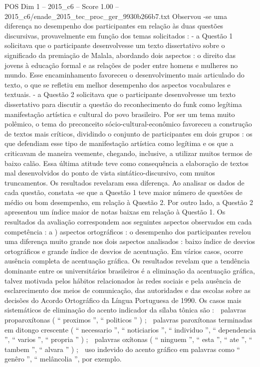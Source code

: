 \begin{textsample}{POS Dim 1 – 2015\_c6 – Score 1.00 – 2015\_c6/enade\_2015\_tec\_proc\_ger\_9930b266b7.txt}
Observou -se uma diferença no desempenho dos participantes em relação às duas questões discursivas, provavelmente em função dos temas solicitados : - a Questão 1 solicitava que o participante desenvolvesse um texto dissertativo sobre o significado da premiação de Malala, abordando dois aspectos : o direito das jovens à educação formal e as relações de poder entre homens e mulheres no mundo.
Esse encaminhamento favoreceu o desenvolvimento mais articulado do texto, o que se refletiu em melhor desempenho dos aspectos vocabulares e textuais. - a Questão 2 solicitava que o participante desenvolvesse um texto dissertativo para discutir a questão do reconhecimento do funk como legítima manifestação artística e cultural do povo brasileiro.
Por ser um tema muito polêmico, o tema do preconceito sócio-cultural-econômico favoreceu a construção de textos mais críticos, dividindo o conjunto de participantes em dois grupos : os que defendiam esse tipo de manifestação artística como legítima e os que a criticavam de maneira veemente, chegando, inclusive, a utilizar muitos termos de baixo calão.
Essa última atitude teve como consequência a elaboração de textos mal desenvolvidos do ponto de vista sintático-discursivo, com muitos truncamentos.
Os resultados revelaram essa diferença.
Ao analisar os dados de cada questão, constata -se que a Questão 1 teve maior número de questões de médio ou bom desempenho, em relação à Questão 2.
Por outro lado, a Questão 2 apresentou um índice maior de notas baixas em relação à Questão 1.
Os resultados da avaliação correspondem aos seguintes aspectos observados em cada competência : a ) aspectos ortográficos : o desempenho dos participantes revelou uma diferença muito grande nos dois aspectos analisados : baixo índice de desvios ortográficos e grande índice de desvios de acentuação.
Em vários casos, ocorre ausência completa de acentuação gráfica.
Os resultados revelam que a tendência dominante entre os universitários brasileiros é a eliminação da acentuação gráfica, talvez motivada pelos hábitos relacionados às redes sociais e pela ausência de esclarecimento dos meios de comunicação, das autoridades e das escolas sobre as decisões do Acordo Ortográfico da Língua Portuguesa de 1990.
Os casos mais sistemáticos de eliminação do acento indicador da sílaba tônica são :  palavras proparoxítonas ( “ proximos ”, “ politicos ” ) ;  palavras paroxítonas terminadas em ditongo crescente ( “ necessario ”, “ noticiarios ”, “ individuo ”, “ dependencia ”, “ varios ”, “ propria ” ) ;  palavras oxítonas ( “ ninguem ”, “ esta ”, “ ate ”, “ tambem ”, “ alvara ” ) ;  uso indevido do acento gráfico em palavras como “ genêro ”, “ melâncolia ”, por exemplo.

\end{textsample}
